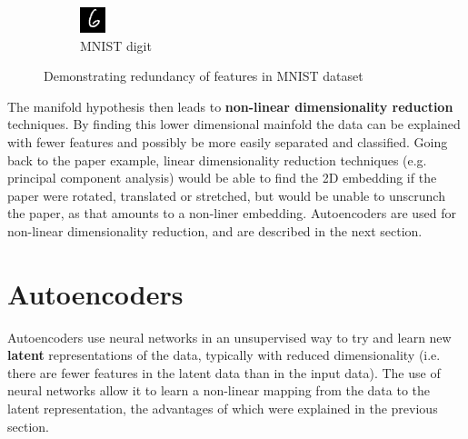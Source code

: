 \documentclass[12pt,a4paper,twoside,openright]{report}
\begin{document}
\begin{figure}[H]
\begin{subfigure}[b]{0.4\linewidth}
    \includegraphics[width=\linewidth,scale=1]{figs/digit.png}
    \caption{MNIST digit}
  \end{subfigure}
  \caption{Demonstrating redundancy of features in MNIST dataset}
  \label{fig:digit}
\end{figure}

The manifold hypothesis then leads to \textbf{non-linear dimensionality reduction} techniques. By finding this lower dimensional
mainfold the data can be explained with fewer features and possibly be more easily separated and classified. Going back to the paper example,
linear dimensionality reduction techniques (e.g. principal component analysis) would be able to find the 2D embedding if the paper were 
rotated, translated or stretched, but would be unable to unscrunch the paper, as that amounts to a non-liner embedding. Autoencoders are 
used for non-linear dimensionality reduction, and are described in the next section.

\section{Autoencoders}

Autoencoders use neural networks in an unsupervised way to try and learn new \textbf{latent} representations of the data, typically with reduced 
dimensionality (i.e. there are fewer features in the latent data than in the input data). The use of neural networks allow it to learn a 
non-linear mapping from the data to the latent representation, the advantages of which were explained in the previous section.
\end{document}
